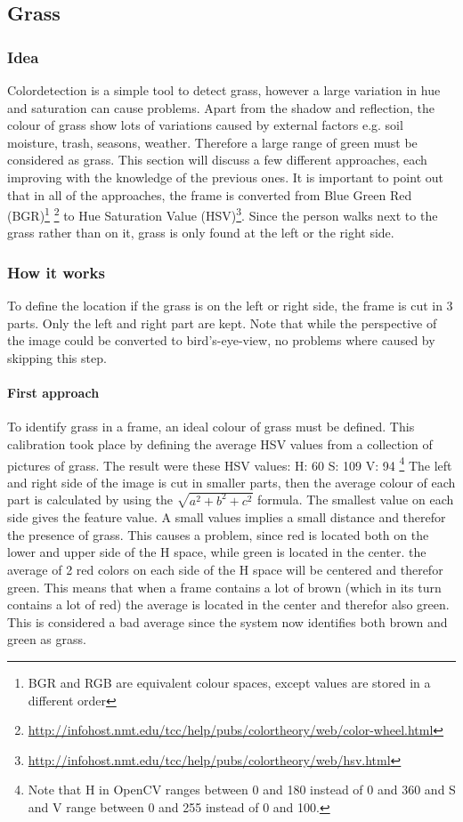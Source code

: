 \subsection{Grass}
\subsubsection{Idea} 
Colordetection is a simple tool to detect grass, however a large variation in hue and saturation can cause problems.
Apart from the shadow and reflection, the colour of grass show lots of variations caused by external factors e.g. soil moisture, trash, seasons, weather. Therefore a large range of green must be considered as grass.
\npar
This section will discuss a few different approaches, each improving with the knowledge of the previous ones.
It is important to point out that in all of the approaches, the frame is converted from Blue Green Red (BGR)\footnote{BGR and RGB are equivalent colour spaces, except values are stored in a different order} \footnote{\url{http://infohost.nmt.edu/tcc/help/pubs/colortheory/web/color-wheel.html}} to Hue Saturation Value (HSV)\footnote{\url{http://infohost.nmt.edu/tcc/help/pubs/colortheory/web/hsv.html}}.
Since the person walks next to the grass rather than on it, grass is only found at the left or the right side.
\subsubsection{How it works}
To define the location if the grass is on the left or right side, the frame is cut in 3 parts. Only the left and right part are kept. Note that while the perspective of the image could be converted to bird's-eye-view, no problems where caused by skipping this step.
\paragraph{First approach}
To identify grass in a frame, an ideal colour of grass must be defined. This calibration took place by defining the average HSV values from a collection of pictures of grass. The result were these HSV values:
H: 60
S: 109
V: 94
\footnote{Note that H in OpenCV ranges between 0 and 180 instead of 0 and 360 and S and V range between 0 and 255 instead of 0 and 100.}
\npar
The left and right side of the image is cut in smaller parts, then the average colour of each part is calculated by
using the \(\sqrt{a^2 + b^2 + c^2}\) formula. The smallest value on each side gives the feature value. A small
values implies a small distance and therefor the presence of grass.  This causes a problem, since red is located both on the lower and upper side of the H space, while green is located in the center. the average of 2 red colors on each side of the H space will be centered and therefor green. This means that when a frame contains a lot of brown (which in its turn contains a lot of red) the average is located in the center and therefor also green. This is considered a bad average since the system now identifies both brown and green as grass.

